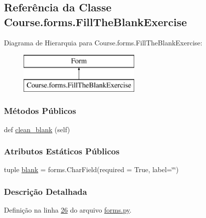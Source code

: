 \hypertarget{classCourse_1_1forms_1_1FillTheBlankExercise}{}\subsection{Referência da Classe Course.\+forms.\+Fill\+The\+Blank\+Exercise}
\label{classCourse_1_1forms_1_1FillTheBlankExercise}
Diagrama de Hierarquia para Course.\+forms.\+Fill\+The\+Blank\+Exercise\+:\begin{figure}[H]
\begin{center}
\leavevmode
\includegraphics[height=2.000000cm]{d2/dfe/classCourse_1_1forms_1_1FillTheBlankExercise}
\end{center}
\end{figure}
\subsubsection*{Métodos Públicos}
\begin{DoxyCompactItemize}
\item 
def \hyperlink{classCourse_1_1forms_1_1FillTheBlankExercise_afd580feb9780a2776dab839180b9dfc9}{clean\+\_\+blank} (self)
\end{DoxyCompactItemize}
\subsubsection*{Atributos Estáticos Públicos}
\begin{DoxyCompactItemize}
\item 
tuple \hyperlink{classCourse_1_1forms_1_1FillTheBlankExercise_a581787b24c05ae5b24bc635b7ae10a41}{blank} = forms.\+Char\+Field(required = True, label=\char`\"{}\char`\"{})
\end{DoxyCompactItemize}


\subsubsection{Descrição Detalhada}


Definição na linha \hyperlink{Course_2forms_8py_source_l00026}{26} do arquivo \hyperlink{Course_2forms_8py_source}{forms.\+py}.



